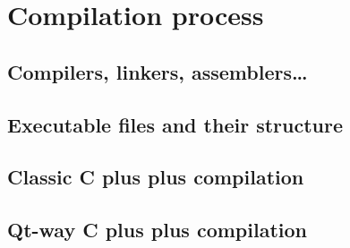 \section{Compilation process}\label{section:compilation}

\subsection{Compilers, linkers, assemblers\ldots}

\subsection{Executable files and their structure}


\subsection{Classic C plus plus compilation}


\subsection{Qt-way C plus plus compilation}